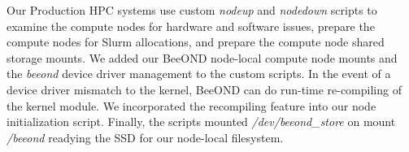 Our Production HPC systems use custom \textit{nodeup} and \textit{nodedown} scripts to examine the compute nodes for hardware and software issues, prepare the compute nodes for Slurm allocations, and prepare the compute node shared storage mounts.  We added our BeeOND node-local compute node mounts and the \textit{beeond} device driver management to the custom scripts.  In the event of a device driver mismatch to the kernel, BeeOND can do run-time re-compiling of the kernel module.  We incorporated the recompiling feature into our node initialization script.  Finally, the scripts mounted \textit{/dev/beeond\_store} on mount \textit{/beeond} readying the SSD for our node-local filesystem.

